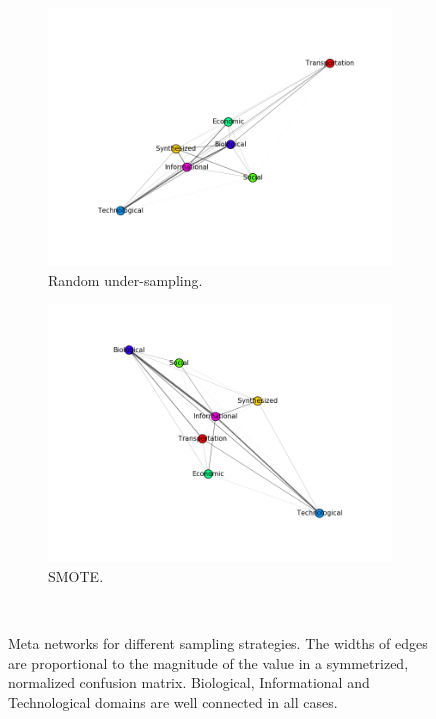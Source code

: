 \documentclass{article}
\begin{document}
\begin{figure}[H]
\medskip
\begin{subfigure}{0.48\textwidth}
\includegraphics[width=\linewidth]{figs/similarity/Domain/RandomUnder_26/graph.png}
\caption{Random under-sampling.} \label{random_under_graph}
\end{subfigure}\hspace*{\fill}
\begin{subfigure}{0.48\textwidth}
\includegraphics[width=\linewidth]{figs/similarity/Domain/SMOTE/graph.png}
\caption{SMOTE.} \label{smote_graph}
\end{subfigure}
\
\caption{Meta networks for different sampling strategies. The widths of edges are proportional to the magnitude of the value in a symmetrized, normalized confusion matrix. Biological, Informational and Technological domains are well connected in all cases.} \label{meta_network}
\end{figure}
\end{document}
